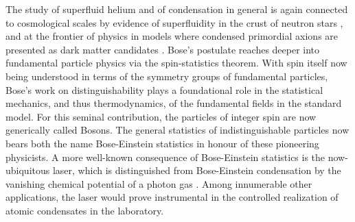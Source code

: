 	The study of superfluid helium and of condensation in general is again connected to cosmological scales by evidence of superfluidity in the crust of neutron stars \cite{Baym69,Martin16,Page11}, and at the frontier of physics in models where condensed primordial axions are presented as dark matter candidates \cite{Mielke09}.
	Bose's postulate reaches deeper into fundamental particle physics via the spin-statistics theorem.
	With spin itself now being understood in terms of the symmetry groups of fundamental particles, Bose's work on distinguishability plays a foundational role in the statistical mechanics, and thus thermodynamics, of the fundamental fields in the standard model. 
	For this seminal contribution, the particles of integer spin are now generically called Bosons.
	The general statistics of indistinguishable particles now bears both the name Bose-Einstein statistics in honour of these pioneering physicists. 
	A more well-known consequence of Bose-Einstein statistics is the now-ubiquitous laser, which is distinguished from Bose-Einstein condensation by the vanishing chemical potential of a photon gas \cite{Klaers10,Schmit16}.
	Among innumerable other applications, the laser would prove instrumental in the controlled realization of atomic condensates in the laboratory.

